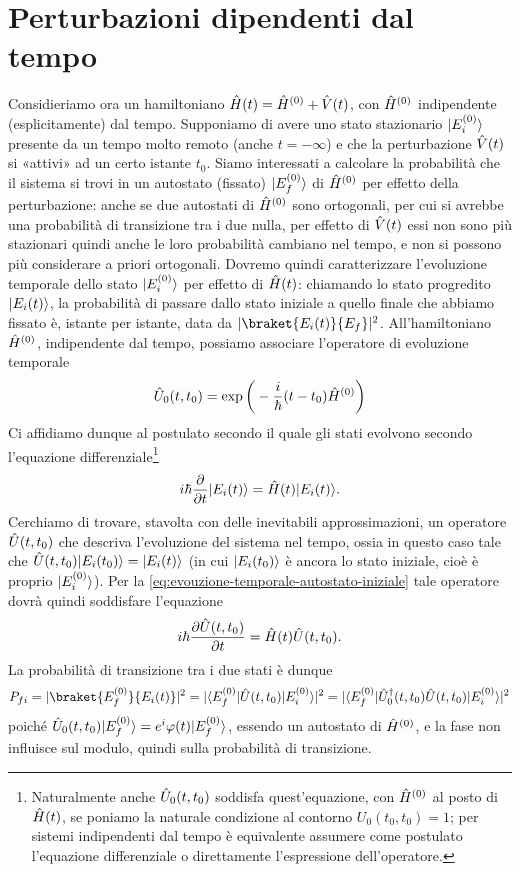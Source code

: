 \section{Perturbazioni dipendenti dal tempo}
Considieriamo ora un hamiltoniano $\hat{H}(t)=\hat{H}^{(0)}+\hat{V}(t)$, con $\hat{H}^{(0)}$ indipendente (esplicitamente) dal tempo.
Supponiamo di avere uno stato stazionario $\lvert E_i^{(0)}\rangle$ presente da un tempo molto remoto (anche $t=-\infty$) e che la perturbazione $\hat{V}(t)$ si «attivi» ad un certo istante $t_0$.
Siamo interessati a calcolare la probabilità che il sistema si trovi in un autostato (fissato) $\lvert E_f^{(0)}\rangle$ di $\hat{H}^{(0)}$ per effetto della perturbazione: anche se due autostati di $\hat{H}^{(0)}$ sono ortogonali, per cui si avrebbe una probabilità di transizione tra i due nulla, per effetto di $\hat{V}(t)$ essi non sono più stazionari quindi anche le loro probabilità cambiano nel tempo, e non si possono più considerare a priori ortogonali.
Dovremo quindi caratterizzare l'evoluzione temporale dello stato $\lvert E_i^{(0)}\rangle$ per effetto di $\hat{H}(t)$: chiamando lo stato progredito $\lvert E_i(t)\rangle$, la probabilità di passare dallo stato iniziale a quello finale che abbiamo fissato è, istante per istante, data da $\abs{\braket{E_i(t)}{E_f}}^2$.
All'hamiltoniano $\hat{H}^{(0)}$, indipendente dal tempo, possiamo associare l'operatore di evoluzione temporale
\begin{equation}
	\hat{U}_0(t,t_0)=\exp\bigg(-\frac{i}{\hbar}(t-t_0)\hat{H}^{(0)}\bigg)
\end{equation}
Ci affidiamo dunque al postulato secondo il quale gli stati evolvono secondo l'equazione differenziale\footnote{Naturalmente anche $\hat{U}_0(t,t_0)$ soddisfa quest'equazione, con $\hat{H}^{(0)}$ al posto di $\hat{H}(t)$, se poniamo la naturale condizione al contorno $U_0(t_0,t_0)=1$; per sistemi indipendenti dal tempo è equivalente assumere come postulato l'equazione differenziale o direttamente l'espressione dell'operatore.}
\begin{equation}
	i\hbar\frac{\partial {}}{\partial {t}}\lvert E_i(t)\rangle=\hat{H}(t)\lvert E_i(t)\rangle.
	\label{eq:evouzione-temporale-autostato-iniziale}
\end{equation}
Cerchiamo di trovare, stavolta con delle inevitabili approssimazioni, un operatore $\hat{U}(t,t_0)$ che descriva l'evoluzione del sistema nel tempo, ossia in questo caso tale che $\hat{U}(t,t_0)\lvert E_i(t_0)\rangle=\lvert E_i(t)\rangle$ (in cui $\lvert E_i(t_0)\rangle$ è ancora lo stato iniziale, cioè è proprio $\lvert E_i^{(0)}\rangle$).
Per la \eqref{eq:evouzione-temporale-autostato-iniziale} tale operatore dovrà quindi soddisfare l'equazione
\begin{equation}
	i\hbar\frac{\partial {\hat{U}(t,t_0)}}{\partial {t}}=\hat{H}(t)\hat{U}(t,t_0).
\end{equation}
La probabilità di transizione tra i due stati è dunque
\begin{equation}
	P_{fi}=\abs{\braket{E_f^{(0)}}{E_i(t)}}^2=\abs{\bra{E_f^{(0)}}\op U(t,t_0)\ket{E_i^{(0)}}}^2=\abs{\bra{E_f^{(0)}}\adj{\op U_0}(t,t_0)\op U(t,t_0)\ket{E_i^{(0)}}}^2
\end{equation}
poich\'e $\hat{U}_0(t,t_0)\lvert E_f^{(0)}\rangle=e^i\varphi(t)\lvert E_f^{(0)}\rangle$, essendo un autostato di $\hat{H}^{(0)}$, e la fase non influisce sul modulo, quindi sulla probabilità di transizione.

